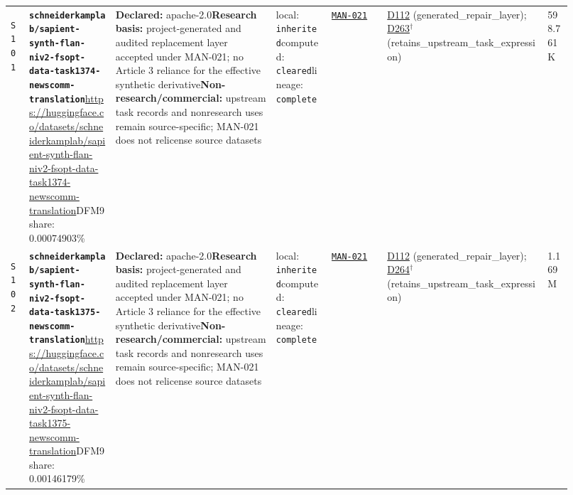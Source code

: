 \documentclass[9pt,a4paper]{article}
\newcommand{\srcid}[1]{\hypertarget{src:#1}{\texttt{#1}}}
\begin{document}
\begin{landscape}
\begin{longtable}{@{}L{0.03\linewidth}L{0.14\linewidth}L{0.26\linewidth}L{0.09\linewidth}L{0.09\linewidth}L{0.265\linewidth}L{0.045\linewidth}@{}}
\srcid{S101} & \textbf{\nolinkurl{schneiderkamplab/sapient-synth-flan-niv2-fsopt-data-task1374-newscomm-translation}}\newline \url{https://huggingface.co/datasets/schneiderkamplab/sapient-synth-flan-niv2-fsopt-data-task1374-newscomm-translation}\newline DFM9 share: 0.00074903\% & \textbf{Declared:} apache-2.0\newline \textbf{Research basis:} project-generated and audited replacement layer accepted under MAN-021; no Article 3 reliance for the effective synthetic derivative\newline \textbf{Non-research/commercial:} upstream task records and nonresearch uses remain source-specific; MAN-021 does not relicense source datasets & local: \texttt{inherited}\newline computed: \texttt{cleared}\newline lineage: \texttt{complete} & \hyperlink{manual:MAN-021}{\texttt{MAN-021}} & \hyperlink{dep:D112}{D112} (generated\_repair\_layer); \hyperlink{dep:D263}{D263}$^{\dagger}$ (retains\_upstream\_task\_expression) & 598.761K \\
\srcid{S102} & \textbf{\nolinkurl{schneiderkamplab/sapient-synth-flan-niv2-fsopt-data-task1375-newscomm-translation}}\newline \url{https://huggingface.co/datasets/schneiderkamplab/sapient-synth-flan-niv2-fsopt-data-task1375-newscomm-translation}\newline DFM9 share: 0.00146179\% & \textbf{Declared:} apache-2.0\newline \textbf{Research basis:} project-generated and audited replacement layer accepted under MAN-021; no Article 3 reliance for the effective synthetic derivative\newline \textbf{Non-research/commercial:} upstream task records and nonresearch uses remain source-specific; MAN-021 does not relicense source datasets & local: \texttt{inherited}\newline computed: \texttt{cleared}\newline lineage: \texttt{complete} & \hyperlink{manual:MAN-021}{\texttt{MAN-021}} & \hyperlink{dep:D112}{D112} (generated\_repair\_layer); \hyperlink{dep:D264}{D264}$^{\dagger}$ (retains\_upstream\_task\_expression) & 1.169M \\

\end{longtable}
\end{landscape}
\end{document}
